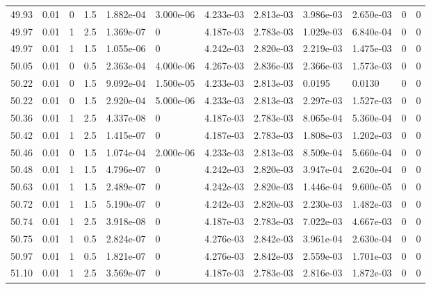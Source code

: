 \documentclass[preview]{standalone}
\begin{document}
{{{{{{{\begin{tabular}{L{1.2cm}C{1.2cm} C{0.3cm}C{0.5cm} C{1.4cm}C{1.4cm} C{1.4cm}C{1.4cm} C{1.6cm}C{1.6cm} C{1.6cm}C{1.6cm}}
  49.93  &  0.01  & 0     & 1.5 &  1.882e-04  & 3.000e-06  &  4.233e-03&   2.813e-03& 3.986e-03 & 2.650e-03   &  0 & 0  \\ 
  49.97  &  0.01  & 1     & 2.5 &  1.369e-07  & 0  &  4.187e-03&   2.783e-03& 1.029e-03 & 6.840e-04   &  0 & 0  \\ 
  49.97  &  0.01  & 1     & 1.5 &  1.055e-06  & 0  &  4.242e-03&   2.820e-03& 2.219e-03 & 1.475e-03   &  0 & 0  \\ 
  50.05  &  0.01  & 0     & 0.5 &  2.363e-04  & 4.000e-06  &  4.267e-03&   2.836e-03& 2.366e-03 & 1.573e-03   &  0 & 0  \\ 
  50.22  &  0.01  & 0     & 1.5 &  9.092e-04  & 1.500e-05  &  4.233e-03&   2.813e-03& 0.0195 & 0.0130   &  0 & 0  \\ 
  50.22  &  0.01  & 0     & 1.5 &  2.920e-04  & 5.000e-06  &  4.233e-03&   2.813e-03& 2.297e-03 & 1.527e-03   &  0 & 0  \\ 
  50.36  &  0.01  & 1     & 2.5 &  4.337e-08  & 0  &  4.187e-03&   2.783e-03& 8.065e-04 & 5.360e-04   &  0 & 0  \\ 
  50.42  &  0.01  & 1     & 2.5 &  1.415e-07  & 0  &  4.187e-03&   2.783e-03& 1.808e-03 & 1.202e-03   &  0 & 0  \\ 
  50.46  &  0.01  & 0     & 1.5 &  1.074e-04  & 2.000e-06  &  4.233e-03&   2.813e-03& 8.509e-04 & 5.660e-04   &  0 & 0  \\ 
  50.48  &  0.01  & 1     & 1.5 &  4.796e-07  & 0  &  4.242e-03&   2.820e-03& 3.947e-04 & 2.620e-04   &  0 & 0  \\ 
  50.63  &  0.01  & 1     & 1.5 &  2.489e-07  & 0  &  4.242e-03&   2.820e-03& 1.446e-04 & 9.600e-05   &  0 & 0  \\ 
  50.72  &  0.01  & 1     & 1.5 &  5.190e-07  & 0  &  4.242e-03&   2.820e-03& 2.230e-03 & 1.482e-03   &  0 & 0  \\ 
  50.74  &  0.01  & 1     & 2.5 &  3.918e-08  & 0  &  4.187e-03&   2.783e-03& 7.022e-03 & 4.667e-03   &  0 & 0  \\ 
  50.75  &  0.01  & 1     & 0.5 &  2.824e-07  & 0  &  4.276e-03&   2.842e-03& 3.961e-04 & 2.630e-04   &  0 & 0  \\ 
  50.97  &  0.01  & 1     & 0.5 &  1.821e-07  & 0  &  4.276e-03&   2.842e-03& 2.559e-03 & 1.701e-03   &  0 & 0  \\ 
  51.10  &  0.01  & 1     & 2.5 &  3.569e-07  & 0  &  4.187e-03&   2.783e-03& 2.816e-03 & 1.872e-03   &  0 & 0  \\ 
\hline 
\end{tabular} 

}}}}}}}
\end{document}
